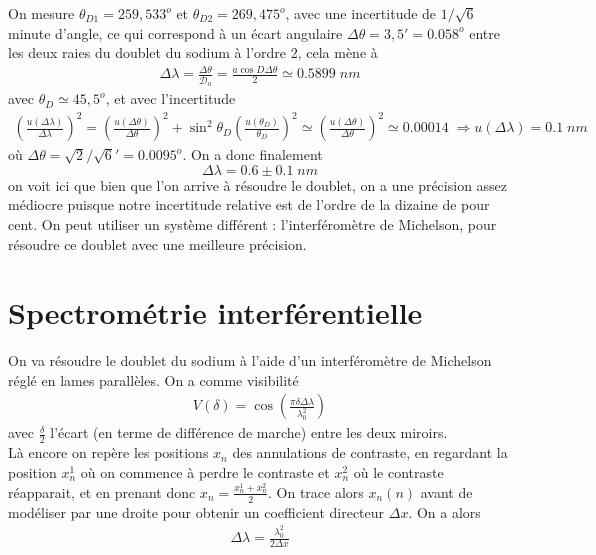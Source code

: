 \documentclass[12pt,prb,aps,epsf]{report}
\begin{document}
On mesure $\theta_{D1} = 259,533^o$ et $\theta_{D2} = 269,475^o$, avec une incertitude de $1/\sqrt{6}$ minute d'angle, ce qui correspond à un écart angulaire $\Delta \theta = 3,5' = 0.058^o$ entre les deux raies du doublet du sodium à l'ordre 2, cela mène à 
\begin{eqnarray}
\Delta \lambda = \frac{\Delta \theta}{\mathcal{D}_a} = \frac{a \cos D \Delta \theta}{2} \simeq 0.5899\;nm 
\end{eqnarray}
avec $\theta_D \simeq 45,5^o$, et avec l'incertitude 
\begin{eqnarray}
\left(\frac{u(\Delta\lambda)}{\Delta \lambda}\right)^2 = \left(\frac{u(\Delta\theta)}{\Delta \theta}\right)^2 + \sin^2\theta_D\left(\frac{u(\theta_D)}{\theta_D}\right)^2 \simeq \left(\frac{u(\Delta\theta)}{\Delta \theta}\right)^2 \simeq0.00014\;\Rightarrow u(\Delta\lambda) = 0.1\;nm
\end{eqnarray}
où $\Delta \theta = \sqrt{2}/\sqrt{6}'=0.0095^o$. On a donc finalement 
\begin{equation}
\Delta \lambda = 0.6 \pm 0.1 \;nm
\end{equation}
on voit ici que bien que l'on arrive à résoudre le doublet, on a une précision assez médiocre puisque notre incertitude relative est de l'ordre de la dizaine de pour cent. On peut utiliser un système différent : l'interféromètre de Michelson, pour résoudre ce doublet avec une meilleure précision.

\section{Spectrométrie interférentielle}
On va résoudre le doublet du sodium à l'aide d'un interféromètre de Michelson réglé en lames parallèles. On a comme visibilité
\begin{eqnarray}
V(\delta) = \cos\left(\frac{\pi\delta \Delta\lambda}{\lambda_0^2}\right)
\end{eqnarray}
avec $\frac{\delta}{2}$ l'écart (en terme de différence de marche) entre les deux miroirs.\\
Là encore on repère les positions $x_n$ des annulations de contraste, en regardant la position $x_n^1$  où on commence à perdre le contraste et $x_n^2$ où le contraste réapparait, et en prenant donc $x_n = \frac{x_n^1+x_n^2}{2}$. On trace alors $x_n(n)$ avant de modéliser par une droite pour obtenir un coefficient directeur $\Delta x$. On a alors 
\begin{eqnarray}
\Delta \lambda = \frac{\lambda_0^2}{2\Delta x}
\end{eqnarray}
\end{document}
